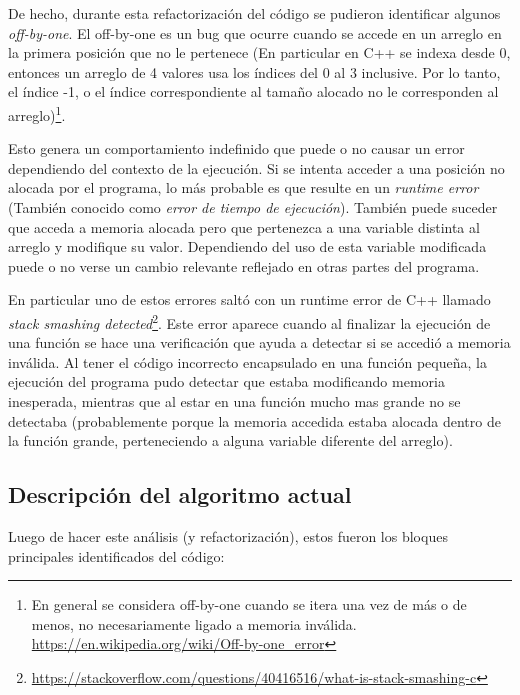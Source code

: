 \documentclass{article}
\begin{document}
De hecho, durante esta refactorización del código se pudieron identificar algunos \emph{off-by-one}. El off-by-one es un bug que ocurre cuando se accede en un arreglo en la primera posición que no le pertenece (En particular en C++ se indexa desde 0, entonces un arreglo de 4 valores usa los índices del 0 al 3 inclusive. Por lo tanto, el índice -1, o el índice correspondiente al tamaño alocado no le corresponden al arreglo)\footnote{En general se considera off-by-one cuando se itera una vez de más o de menos, no necesariamente ligado a memoria inválida. \url{https://en.wikipedia.org/wiki/Off-by-one_error}}.

Esto genera un comportamiento indefinido que puede o no causar un error dependiendo del contexto de la ejecución. Si se intenta acceder a una posición no alocada por el programa, lo más probable es que resulte en un \emph{runtime error} (También conocido como \emph{error de tiempo de ejecución}). También puede suceder que acceda a memoria alocada pero que pertenezca a una variable distinta al arreglo y modifique su valor. Dependiendo del uso de esta variable modificada puede o no verse un cambio relevante reflejado en otras partes del programa.

En particular uno de estos errores saltó con un runtime error de C++ llamado \emph{stack smashing detected}\footnote{\url{https://stackoverflow.com/questions/40416516/what-is-stack-smashing-c}}. Este error aparece cuando al finalizar la ejecución de una función se hace una verificación que ayuda a detectar si se accedió a memoria inválida. Al tener el código incorrecto encapsulado en una función pequeña, la ejecuci\'on del programa pudo detectar que estaba modificando memoria inesperada, mientras que al estar  en una funci\'on mucho mas grande no se detectaba (probablemente porque la memoria accedida estaba alocada dentro de la función grande, perteneciendo a alguna variable diferente del arreglo).


\subsection{Descripción del algoritmo actual}

Luego de hacer este análisis (y refactorización), estos fueron los bloques principales identificados del código:
\end{document}
